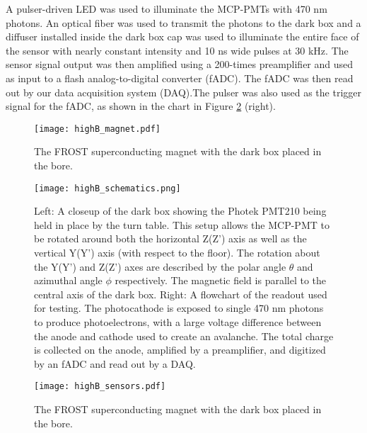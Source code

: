 A pulser-driven LED was used to illuminate the MCP-PMTs with 470 nm photons. An optical fiber was used to transmit the photons to the dark box and a diffuser installed inside the dark box cap was used to illuminate the entire face of the sensor with nearly constant intensity and 10 ns wide pulses at 30 kHz. The sensor signal output was then amplified using a 200-times preamplifier and used as input to a flash analog-to-digital converter (fADC). The fADC was then read out by our data acquisition system (DAQ).The pulser was also used as the trigger signal for the fADC, as shown in the chart in Figure \ref{fig:highB_schematics} (right).


\begin{figure}[!htb]
	\centering
	\texttt{[image: highB\_magnet.pdf]}
	\caption{The FROST superconducting magnet with the dark box placed in the bore.}
	\label{fig:highB_magnet}
\end{figure}

\begin{figure}[!htb]
	\centering
	\texttt{[image: highB\_schematics.png]}
	\caption{Left: A closeup of the dark box showing the Photek PMT210 being held in place by the turn table. This setup allows the MCP-PMT to be rotated around both the horizontal Z(Z') axis as well as the vertical Y(Y') axis (with respect to the floor). The rotation about the Y(Y') and Z(Z') axes are described by the polar angle $\theta$ and azimuthal angle $\phi$ respectively. The magnetic field is parallel to the central axis of the dark box. Right: A flowchart of the readout used for testing. The photocathode is exposed to single 470 nm photons to produce photoelectrons, with a large voltage difference between the anode and cathode used to create an avalanche. The total charge is collected on the anode, amplified by a preamplifier, and digitized by an fADC and read out by a DAQ. \cite{HighB_DIRC2015} }
	\label{fig:highB_schematics}
\end{figure}

\begin{figure}[!htb]
	\centering
	\texttt{[image: highB\_sensors.pdf]}
	\caption{The FROST superconducting magnet with the dark box placed in the bore.}
	\label{fig:highB_sensors}
\end{figure}